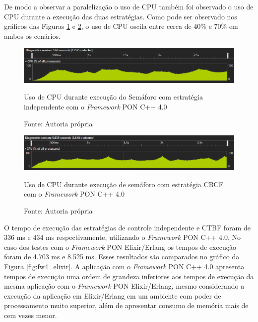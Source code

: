 De modo a observar a paralelização o uso de CPU também foi observado o uso de
CPU durante a execução das duas estratégias. Como pode ser observado nos
gráficos das Figuras \ref{fig:cpu_cta} e \ref{fig:cpu_cbcf}, o uso de CPU oscila
entre cerca de 40\% e 70\% em ambos os cenários.

\begin{figure}[!htb]
\centering
\includegraphics[width=\textwidth]{../figures/cta_cpu.png}
\caption{Uso de CPU durante execução do Semáforo com estratégia independente com
o \textit{Framework} PON C++ 4.0}
\smallskip
\caption*{Fonte: Autoria própria}
\label{fig:cpu_cta}
\end{figure}

\begin{figure}[!htb]
\centering
\includegraphics[width=\textwidth]{../figures/cbcl_cpu.png}
\caption{Uso de CPU durante execução de semáforo com estratégia CBCF com o
\textit{Framework} PON C++ 4.0}
\smallskip
\caption*{Fonte: Autoria própria}
\label{fig:cpu_cbcf}
\end{figure}
\FloatBarrier

O tempo de execução das estratégias de controle independente e CTBF foram de 336
ms e 434 ms respectivamente, utilizando o \textit{Framework} PON C++ 4.0. No
caso dos testes com o \textit{Framework} PON Elixir/Erlang os tempos de execução
foram de 4.703 ms e 8.525 ms. Esses resultados são comparados no gráfico da
Figura \ref{fig:fw4_elixir}. A aplicação com o \textit{Framework} PON C++ 4.0
apresenta tempos de execução uma ordem de grandeza inferiores aos tempos de
execução da mesma aplicação com o \textit{Framework} PON Elixir/Erlang, mesmo
considerando a execução da aplicação em Elixir/Erlang em um ambiente com poder
de processamento muito superior, além de apresentar consumo de memória mais de
cem vezes menor.

